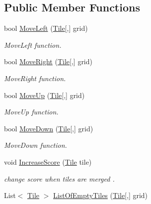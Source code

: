 \subsection*{Public Member Functions}
\begin{DoxyCompactItemize}
\item 
bool \mbox{\hyperlink{interface_game_1_1_i_game_logic_abae3146afb71b9b144c13b189a26fb17}{Move\+Left}} (\mbox{\hyperlink{class_game_1_1_tile}{Tile}}\mbox{[},\mbox{]} grid)
\begin{DoxyCompactList}\small\item\em Move\+Left function. \end{DoxyCompactList}\item 
bool \mbox{\hyperlink{interface_game_1_1_i_game_logic_a7ae3b1cdeb4f6eb82ee6298bdaa05b9e}{Move\+Right}} (\mbox{\hyperlink{class_game_1_1_tile}{Tile}}\mbox{[},\mbox{]} grid)
\begin{DoxyCompactList}\small\item\em Move\+Right function. \end{DoxyCompactList}\item 
bool \mbox{\hyperlink{interface_game_1_1_i_game_logic_a13ef4621073f1ad055c2c62a92411f03}{Move\+Up}} (\mbox{\hyperlink{class_game_1_1_tile}{Tile}}\mbox{[},\mbox{]} grid)
\begin{DoxyCompactList}\small\item\em Move\+Up function. \end{DoxyCompactList}\item 
bool \mbox{\hyperlink{interface_game_1_1_i_game_logic_ae4106eb97e72a42e76fd0d286fd7b10b}{Move\+Down}} (\mbox{\hyperlink{class_game_1_1_tile}{Tile}}\mbox{[},\mbox{]} grid)
\begin{DoxyCompactList}\small\item\em Move\+Down function. \end{DoxyCompactList}\item 
void \mbox{\hyperlink{interface_game_1_1_i_game_logic_a1a1127f02ceb601a80694ee69e25c0c7}{Increase\+Score}} (\mbox{\hyperlink{class_game_1_1_tile}{Tile}} tile)
\begin{DoxyCompactList}\small\item\em change score when tiles are merged . \end{DoxyCompactList}\item 
List$<$ \mbox{\hyperlink{class_game_1_1_tile}{Tile}} $>$ \mbox{\hyperlink{interface_game_1_1_i_game_logic_a9453d57d56d6af99aaa89d2b946430f3}{List\+Of\+Empty\+Tiles}} (\mbox{\hyperlink{class_game_1_1_tile}{Tile}}\mbox{[},\mbox{]} grid)

\end{DoxyCompactItemize}

